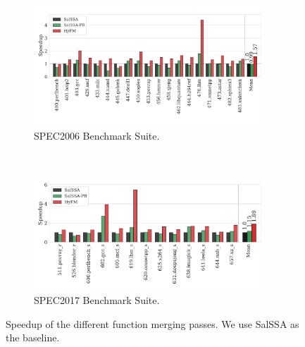 \begin{figure}[h]
  \centering
  \begin{subfigure}{\textwidth}
    \centering
    \includegraphics[width=0.95\textwidth]{src/fastfm/figs/fm-speedup-spec2006.pdf}
    \caption{SPEC2006 Benchmark Suite.}
    \label{fig:code-size-spec2006}
  \end{subfigure}
  \\
  \begin{subfigure}{\textwidth}
  \centering
    \includegraphics[width=0.95\textwidth]{src/fastfm/figs/fm-speedup-spec2017.pdf}
    \caption{SPEC2017 Benchmark Suite.}
    \label{fig:code-size-spec2017}
  \end{subfigure}
  \caption{Speedup of the different function merging passes. We use SalSSA as the baseline.}
  \label{fig:fm-speedup}
\end{figure}

